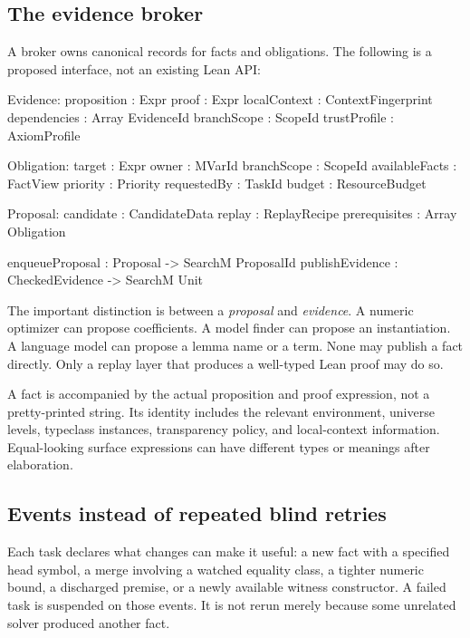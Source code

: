 \documentclass[11pt,a4paper]{article}
\begin{document}
\subsection{The evidence broker}

A broker owns canonical records for facts and obligations. The following is a proposed interface, not an existing Lean API:
\begin{code}
Evidence:
  proposition    : Expr
  proof          : Expr
  localContext   : ContextFingerprint
  dependencies   : Array EvidenceId
  branchScope    : ScopeId
  trustProfile   : AxiomProfile

Obligation:
  target         : Expr
  owner          : MVarId
  branchScope    : ScopeId
  availableFacts : FactView
  priority       : Priority
  requestedBy    : TaskId
  budget         : ResourceBudget

Proposal:
  candidate      : CandidateData
  replay         : ReplayRecipe
  prerequisites  : Array Obligation

enqueueProposal : Proposal -> SearchM ProposalId
publishEvidence : CheckedEvidence -> SearchM Unit
\end{code}

The important distinction is between a \emph{proposal} and \emph{evidence}. A numeric optimizer can propose coefficients. A model finder can propose an instantiation. A language model can propose a lemma name or a term. None may publish a fact directly. Only a replay layer that produces a well-typed Lean proof may do so.

A fact is accompanied by the actual proposition and proof expression, not a pretty-printed string. Its identity includes the relevant environment, universe levels, typeclass instances, transparency policy, and local-context information. Equal-looking surface expressions can have different types or meanings after elaboration.

\subsection{Events instead of repeated blind retries}

Each task declares what changes can make it useful: a new fact with a specified head symbol, a merge involving a watched equality class, a tighter numeric bound, a discharged premise, or a newly available witness constructor. A failed task is suspended on those events. It is not rerun merely because some unrelated solver produced another fact.
\end{document}
